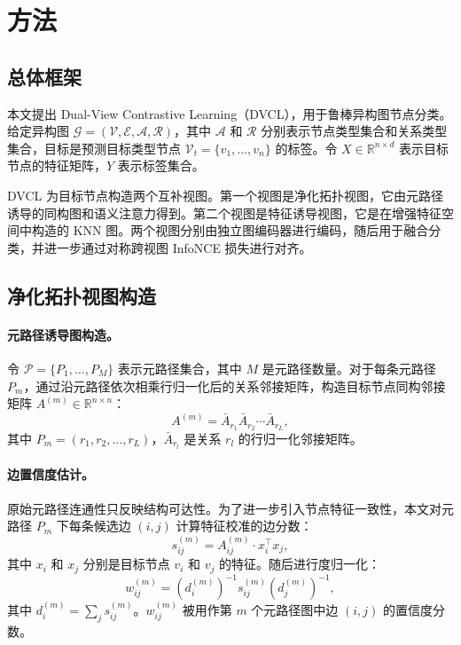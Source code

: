 \section{方法}
\label{sec:method-zh}

\subsection{总体框架}

本文提出 Dual-View Contrastive Learning（DVCL），用于鲁棒异构图节点分类。给定异构图
$\mathcal{G}=(\mathcal{V},\mathcal{E},\mathcal{A},\mathcal{R})$，其中 $\mathcal{A}$ 和 $\mathcal{R}$ 分别表示节点类型集合和关系类型集合，目标是预测目标类型节点 $\mathcal{V}_t=\{v_1,\ldots,v_n\}$ 的标签。令 $X\in\mathbb{R}^{n\times d}$ 表示目标节点的特征矩阵，$Y$ 表示标签集合。

DVCL 为目标节点构造两个互补视图。第一个视图是净化拓扑视图，它由元路径诱导的同构图和语义注意力得到。第二个视图是特征诱导视图，它是在增强特征空间中构造的 KNN 图。两个视图分别由独立图编码器进行编码，随后用于融合分类，并进一步通过对称跨视图 InfoNCE 损失进行对齐。

\subsection{净化拓扑视图构造}

\paragraph{元路径诱导图构造。}
令 $\mathcal{P}=\{P_1,\ldots,P_M\}$ 表示元路径集合，其中 $M$ 是元路径数量。对于每条元路径 $P_m$，通过沿元路径依次相乘行归一化后的关系邻接矩阵，构造目标节点同构邻接矩阵 $A^{(m)}\in\mathbb{R}^{n\times n}$：
\begin{equation}
A^{(m)}
=
\bar{A}_{r_1}\bar{A}_{r_2}\cdots \bar{A}_{r_L},
\end{equation}
其中 $P_m=(r_1,r_2,\ldots,r_L)$，$\bar{A}_{r_l}$ 是关系 $r_l$ 的行归一化邻接矩阵。

\paragraph{边置信度估计。}
原始元路径连通性只反映结构可达性。为了进一步引入节点特征一致性，本文对元路径 $P_m$ 下每条候选边 $(i,j)$ 计算特征校准的边分数：
\begin{equation}
s_{ij}^{(m)}
=
A_{ij}^{(m)} \cdot x_i^{\top}x_j,
\end{equation}
其中 $x_i$ 和 $x_j$ 分别是目标节点 $v_i$ 和 $v_j$ 的特征。随后进行度归一化：
\begin{equation}
w_{ij}^{(m)}
=
(d_i^{(m)})^{-1}
s_{ij}^{(m)}
(d_j^{(m)})^{-1},
\end{equation}
其中 $d_i^{(m)}=\sum_j s_{ij}^{(m)}$。$w_{ij}^{(m)}$ 被用作第 $m$ 个元路径图中边 $(i,j)$ 的置信度分数。

